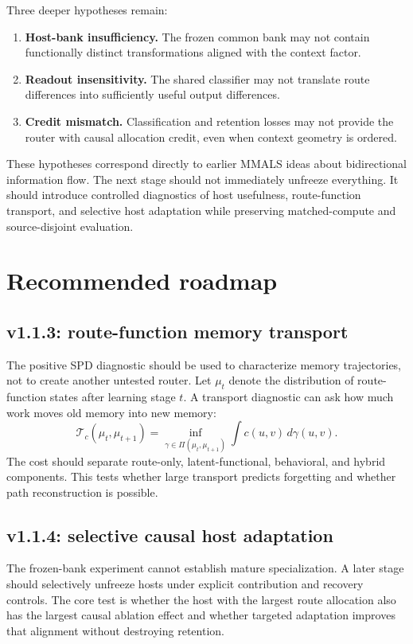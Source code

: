 \documentclass[11pt,a4paper]{article}
\begin{document}
Three deeper hypotheses remain:
\begin{enumerate}
\item \textbf{Host-bank insufficiency.} The frozen common bank may not contain functionally distinct transformations aligned with the context factor.
\item \textbf{Readout insensitivity.} The shared classifier may not translate route differences into sufficiently useful output differences.
\item \textbf{Credit mismatch.} Classification and retention losses may not provide the router with causal allocation credit, even when context geometry is ordered.
\end{enumerate}

These hypotheses correspond directly to earlier MMALS ideas about bidirectional information flow. The next stage should not immediately unfreeze everything. It should introduce controlled diagnostics of host usefulness, route-function transport, and selective host adaptation while preserving matched-compute and source-disjoint evaluation.

\section{Recommended roadmap}
\subsection{v1.1.3: route-function memory transport}
The positive SPD diagnostic should be used to characterize memory trajectories, not to create another untested router. Let $\mu_t$ denote the distribution of route-function states after learning stage $t$. A transport diagnostic can ask how much work moves old memory into new memory:
\begin{equation}
 \mathcal{T}_{c}(\mu_t,\mu_{t+1})
 =\inf_{\gamma\in\Pi(\mu_t,\mu_{t+1})}
 \int c(u,v)\,d\gamma(u,v).
\end{equation}
The cost should separate route-only, latent-functional, behavioral, and hybrid components. This tests whether large transport predicts forgetting and whether path reconstruction is possible.

\subsection{v1.1.4: selective causal host adaptation}
The frozen-bank experiment cannot establish mature specialization. A later stage should selectively unfreeze hosts under explicit contribution and recovery controls. The core test is whether the host with the largest route allocation also has the largest causal ablation effect and whether targeted adaptation improves that alignment without destroying retention.
\end{document}
